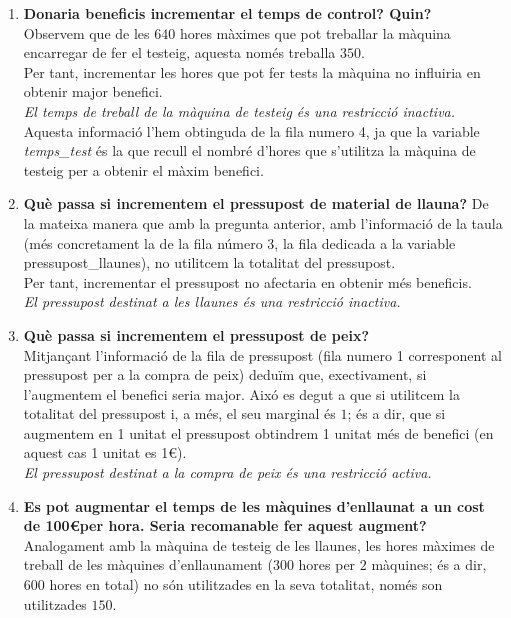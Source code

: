 \documentclass[a4paper, 11pt]{article}
\begin{document}
\begin{enumerate}
    \item \textbf{Donaria beneficis incrementar el temps de control? Quin?}\\
    Observem que de les $640$ hores màximes que pot treballar la màquina encarregar de fer el testeig, aquesta només treballa $350$.\\
    Per tant, incrementar les hores que pot fer tests la màquina no influiria en obtenir major benefici.\\
    \textit{El temps de treball de la màquina de testeig  és una restricció inactiva.}\\
    Aquesta informació l'hem obtinguda de la fila numero 4, ja que la variable \textit{temps\_test} és la que recull el nombré d'hores que s'utilitza la màquina de testeig per a obtenir el màxim benefici.
    \item \textbf{Què passa si incrementem el pressupost de material de llauna?}
    De la mateixa manera que amb la pregunta anterior, amb l'informació de la taula (més concretament la de la fila número 3, la fila dedicada a la variable pressupost\_llaunes), no utilitcem la totalitat del pressupost.\\
    Per tant, incrementar el pressupost no afectaria en obtenir més beneficis.\\
    \textit{El pressupost destinat a les llaunes és una restricció inactiva.}
    \item \textbf{Què passa si incrementem el pressupost de peix?}\\
    Mitjançant l'informació de la fila de pressupost (fila numero 1 corresponent al pressupost per a la compra de peix) deduïm que, exectivament, si l'augmentem el benefici seria major. Aixó es degut a que si utilitcem la totalitat del pressupost i, a més, el seu marginal és $1$; és a dir, que si augmentem en 1 unitat el pressupost obtindrem 1 unitat més de benefici (en aquest cas 1 unitat es 1\euro). \\
    \textit{El pressupost destinat a la compra de peix és una restricció activa.}
    \item \textbf{Es pot augmentar el temps de les màquines d’enllaunat a un cost de 100\euro \hspace{0.0625}per hora. Seria recomanable fer aquest augment?}\\
    Analogament amb la màquina de testeig de les llaunes, les hores màximes de treball de les màquines d'enllaunament ($300$ hores per $2$ màquines; és a dir, $600$ hores en total) no són utilitzades en la seva totalitat, només son utilitzades $150$.\\

\end{enumerate}
\end{document}
